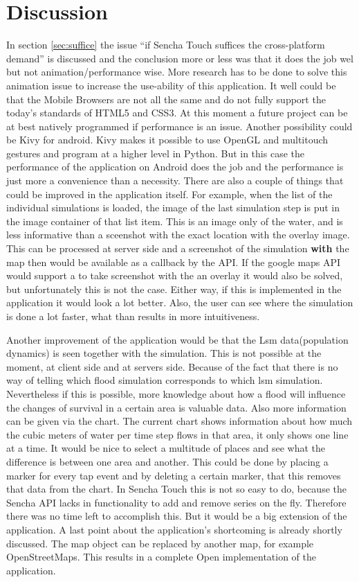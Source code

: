 \section{Discussion}
In section \ref{sec:suffice} the issue ``if Sencha Touch suffices the cross-platform demand'' is discussed and the conclusion more or less was that it does the job wel but not animation/performance wise. More research has to be done to solve this animation issue to increase the use-ability of this application. It well could be that the Mobile Browsers are not all the same and do not fully support the today's standards of HTML5 and CSS3. At this moment a future project can be at best natively programmed if performance is an issue. Another possibility could be Kivy \cite{kivy} for android. Kivy makes it possible to use OpenGL \cite{opengl} and multitouch gestures and program at a higher level in Python\cite{python}. But in this case the performance of the application on Android does the job and the performance is just more a convenience than a necessity. 
There are also a couple of things that could be improved in the application itself. For example, when the list of the individual simulations is loaded, the image of the last simulation step is put in the image container of that list item. This is an image only of the water, and is less informative than a sceenshot with the exact location with the overlay image. This can be processed at server side and a screenshot of the simulation \textbf{with} the map then would be available as a callback by the API. If the google maps API would support a to take screenshot with the an overlay it would also be solved, but unfortunately this is not the case. Either way, if this is implemented in the application it would look a lot better. Also, the user can see where the simulation is done a lot faster, what than results in more intuitiveness. 

Another improvement of the application would be that the Lsm data(population dynamics) is seen together with the simulation. This is not possible at the moment, at client side and at servers side. Because of the fact that there is no way of telling which flood simulation corresponds to which lsm simulation. Nevertheless if this is possible, more knowledge about how a flood will influence the changes of survival in a certain area is valuable data. Also more information can be given via the chart. The current chart shows information about how much the cubic meters of water per time step flows in that area, it only shows one line at a time. It would be nice to select a multitude of places and see what the difference is between one area and another. This could be done by placing a marker for every tap event and by deleting a certain marker, that this removes that data from the chart. In Sencha Touch this is not so easy to do, because the Sencha API lacks in functionality to add and remove series on the fly. Therefore there was no time left to accomplish this. But it would be a big extension of the application. 
A last point about the application's shortcoming is already shortly discussed. The map object can be replaced by another map, for example OpenStreetMaps. This results in a complete Open implementation of the application.

